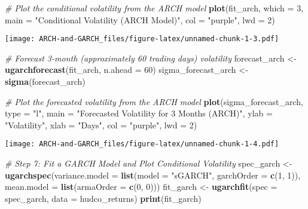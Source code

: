 \documentclass[
]{article}
\newenvironment{Shaded}{\begin{snugshade}}{\end{snugshade}}
\newcommand{\AttributeTok}[1]{\textcolor[rgb]{0.13,0.29,0.53}{#1}}
\newcommand{\CommentTok}[1]{\textcolor[rgb]{0.56,0.35,0.01}{\textit{#1}}}
\newcommand{\DecValTok}[1]{\textcolor[rgb]{0.00,0.00,0.81}{#1}}
\newcommand{\FunctionTok}[1]{\textcolor[rgb]{0.13,0.29,0.53}{\textbf{#1}}}
\newcommand{\NormalTok}[1]{#1}
\newcommand{\OtherTok}[1]{\textcolor[rgb]{0.56,0.35,0.01}{#1}}
\newcommand{\StringTok}[1]{\textcolor[rgb]{0.31,0.60,0.02}{#1}}
\begin{document}
\begin{Shaded}
\begin{Highlighting}[]
\CommentTok{\# Plot the conditional volatility from the ARCH model}
\FunctionTok{plot}\NormalTok{(fit\_arch, }\AttributeTok{which =} \DecValTok{3}\NormalTok{, }\AttributeTok{main =} \StringTok{"Conditional Volatility (ARCH Model)"}\NormalTok{, }
     \AttributeTok{col =} \StringTok{"purple"}\NormalTok{, }\AttributeTok{lwd =} \DecValTok{2}\NormalTok{)}
\end{Highlighting}
\end{Shaded}

\texttt{[image: ARCH-and-GARCH\_files/figure-latex/unnamed-chunk-1-3.pdf]}

\begin{Shaded}
\begin{Highlighting}[]
\CommentTok{\# Forecast 3{-}month (approximately 60 trading days) volatility}
\NormalTok{forecast\_arch }\OtherTok{\textless{}{-}} \FunctionTok{ugarchforecast}\NormalTok{(fit\_arch, }\AttributeTok{n.ahead =} \DecValTok{60}\NormalTok{)}
\NormalTok{sigma\_forecast\_arch }\OtherTok{\textless{}{-}} \FunctionTok{sigma}\NormalTok{(forecast\_arch)}

\CommentTok{\# Plot the forecasted volatility from the ARCH model}
\FunctionTok{plot}\NormalTok{(sigma\_forecast\_arch, }\AttributeTok{type =} \StringTok{"l"}\NormalTok{, }\AttributeTok{main =} \StringTok{"Forecasted Volatility for 3 Months (ARCH)"}\NormalTok{, }
     \AttributeTok{ylab =} \StringTok{"Volatility"}\NormalTok{, }\AttributeTok{xlab =} \StringTok{"Days"}\NormalTok{, }\AttributeTok{col =} \StringTok{"purple"}\NormalTok{, }\AttributeTok{lwd =} \DecValTok{2}\NormalTok{)}
\end{Highlighting}
\end{Shaded}

\texttt{[image: ARCH-and-GARCH\_files/figure-latex/unnamed-chunk-1-4.pdf]}

\begin{Shaded}
\begin{Highlighting}[]
\CommentTok{\# Step 7: Fit a GARCH Model and Plot Conditional Volatility}
\NormalTok{spec\_garch }\OtherTok{\textless{}{-}} \FunctionTok{ugarchspec}\NormalTok{(}\AttributeTok{variance.model =} \FunctionTok{list}\NormalTok{(}\AttributeTok{model =} \StringTok{"sGARCH"}\NormalTok{, }\AttributeTok{garchOrder =} \FunctionTok{c}\NormalTok{(}\DecValTok{1}\NormalTok{, }\DecValTok{1}\NormalTok{)), }\AttributeTok{mean.model =} \FunctionTok{list}\NormalTok{(}\AttributeTok{armaOrder =} \FunctionTok{c}\NormalTok{(}\DecValTok{0}\NormalTok{, }\DecValTok{0}\NormalTok{)))}
\NormalTok{fit\_garch }\OtherTok{\textless{}{-}} \FunctionTok{ugarchfit}\NormalTok{(}\AttributeTok{spec =}\NormalTok{ spec\_garch, }\AttributeTok{data =}\NormalTok{ hudco\_returns)}
\FunctionTok{print}\NormalTok{(fit\_garch)}
\end{Highlighting}
\end{Shaded}
\end{document}
